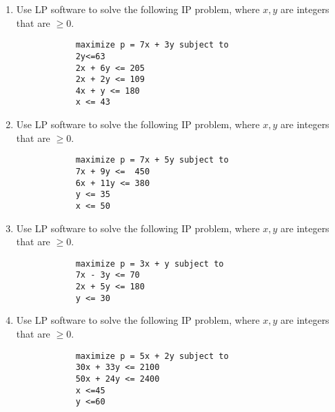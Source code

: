 \documentclass[a4paper,12pt]{article}
\begin{document}
\begin{enumerate}
 		\item Use LP software to solve the following IP problem, where $x,y$ are integers that are $\geq 0$.
 		\begin{framed}
 			\begin{verbatim}
 			maximize p = 7x + 3y subject to
 			2y<=63
 			2x + 6y <= 205
 			2x + 2y <= 109
 			4x + y <= 180
 			x <= 43
 			\end{verbatim}
 		\end{framed}
 		\newpage	
 		\item Use LP software to solve the following IP problem, where $x,y$ are integers that are $\geq 0$.
 		\begin{framed}
 			\begin{verbatim}
 			maximize p = 7x + 5y subject to
 			7x + 9y <=  450
 			6x + 11y <= 380
 			y <= 35
 			x <= 50
 			\end{verbatim}
 		\end{framed}
 		
 		\item Use LP software to solve the following IP problem, where $x,y$ are integers that are $\geq 0$.
 		\begin{framed}
 			\begin{verbatim}
 			maximize p = 3x + y subject to
 			7x - 3y <= 70
 			2x + 5y <= 180
 			y <= 30
 			\end{verbatim}
 		\end{framed}
 		
 		\item Use LP software to solve the following IP problem, where $x,y$ are integers that are $\geq 0$.
 		\begin{framed}
 			\begin{verbatim}
 			maximize p = 5x + 2y subject to
 			30x + 33y <= 2100
 			50x + 24y <= 2400
 			x <=45
 			y <=60
 			\end{verbatim}
 		\end{framed}
 		

\end{enumerate}
\end{document}
